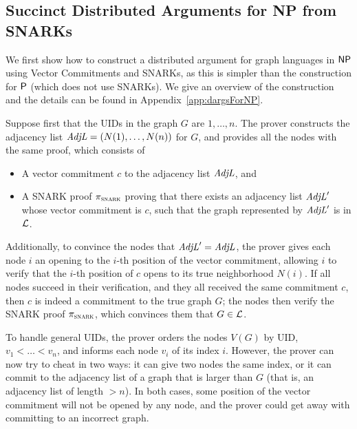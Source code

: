 \subsection{Succinct Distributed Arguments for NP from SNARKs}\label{sec:dargsForNP}
We first show how to construct a distributed argument for graph languages in ${\mathsf{NP}}$ using Vector Commitments and SNARKs,
as this is simpler than the construction for ${\mathsf{P}}$ (which does not use SNARKs).
We give an overview of the construction and the details
can be found in Appendix~\ref{app:dargsForNP}.


Suppose first that the UIDs in the graph $G$ are $1,\ldots,n$.
The prover constructs the adjacency list $\mathit{ AdjL } = (N(1),\ldots,N(n))$ for $G$,
and
provides all the nodes with the same proof, which consists of
\begin{itemize}
	\item A vector commitment $c$ to the adjacency list $\mathit{ AdjL }$, and
        \item A SNARK proof $\pi_\textsc{snark}$ proving that there exists an adjacency list $\mathit{ AdjL }'$ whose vector commitment is $c$, such that the graph represented by $\mathit{ AdjL }'$ is in $\mathcal{L}$.
\end{itemize}
Additionally, to convince the nodes that $\mathit{ AdjL }' = \mathit{ AdjL }$,
the prover gives each node $i$ an opening to the $i$-th position of the vector commitment, allowing $i$ to verify that the $i$-th position of $c$ opens to its true neighborhood $N(i)$.
If all nodes succeed in their verification, and they all received the same commitment $c$, then $c$ is indeed a commitment to the true graph $G$; the nodes then verify the SNARK proof $\pi_\textsc{snark}$, which convinces them that $G \in \mathcal{L}$.

To handle general UIDs, the prover orders the nodes $V(G)$ by UID, $v_1 < \ldots < v_n$,
and informs each node $v_i$ of its index $i$.
However, the prover can now try to cheat in two ways:
it can give two nodes the same index, or it can commit to the adjacency list of a graph that is
larger than $G$ (that is, an adjacency list of length $> n$).
In both cases, some position of the vector commitment will not be opened by any node,
and the prover could get away with committing to an incorrect graph.


